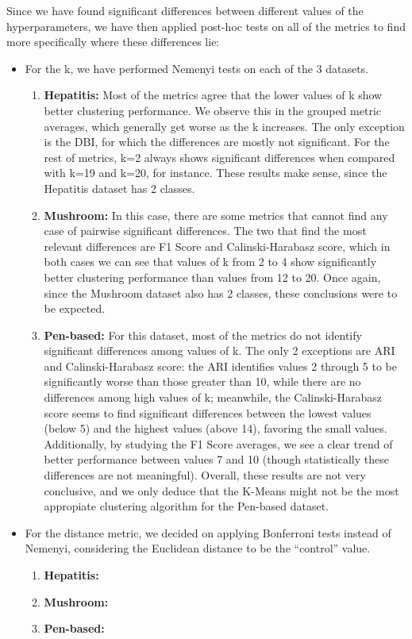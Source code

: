 Since we have found significant differences between different values of the hyperparameters, we have then applied post-hoc tests on all of the metrics to find more specifically where these differences lie:
\begin{itemize}
    \item For the k, we have performed Nemenyi tests on each of the 3 datasets.
    \begin{enumerate}
        \item \textbf{Hepatitis:} Most of the metrics agree that the lower values of k show better clustering performance. We observe this in the grouped metric averages, which generally get worse as the k increases. The only exception is the DBI, for which the differences are mostly not significant. For the rest of metrics, k=2 always shows significant differences when compared with k=19 and k=20, for instance. These results make sense, since the Hepatitis dataset has 2 classes.
        \item \textbf{Mushroom:} In this case, there are some metrics that cannot find any case of pairwise significant differences. The two that find the most relevant differences are F1 Score and Calinski-Harabasz score, which in both cases we can see that values of k from 2 to 4 show significantly better clustering performance than values from 12 to 20. Once again, since the Mushroom dataset also has 2 classes, these conclusions were to be expected.
        \item \textbf{Pen-based:} For this dataset, most of the metrics do not identify significant differences among values of k. The only 2 exceptions are ARI and Calinski-Harabasz score: the ARI identifies values 2 through 5 to be significantly worse than those greater than 10, while there are no differences among high values of k; meanwhile, the Calinski-Harabasz score seems to find significant differences between the lowest values (below 5) and the highest values (above 14), favoring the small values. Additionally, by studying the F1 Score averages, we see a clear trend of better performance between values 7 and 10 (though statistically these differences are not meaningful). Overall, these results are not very conclusive, and we only deduce that the K-Means might not be the most appropiate clustering algorithm for the Pen-based dataset.
    \end{enumerate}
    \item For the distance metric, we decided on applying Bonferroni tests instead of Nemenyi, considering the Euclidean distance to be the ``control'' value.
    \begin{enumerate}
        \item \textbf{Hepatitis:} 
        \item \textbf{Mushroom:} 
        \item \textbf{Pen-based:} 
    \end{enumerate}
\end{itemize}
